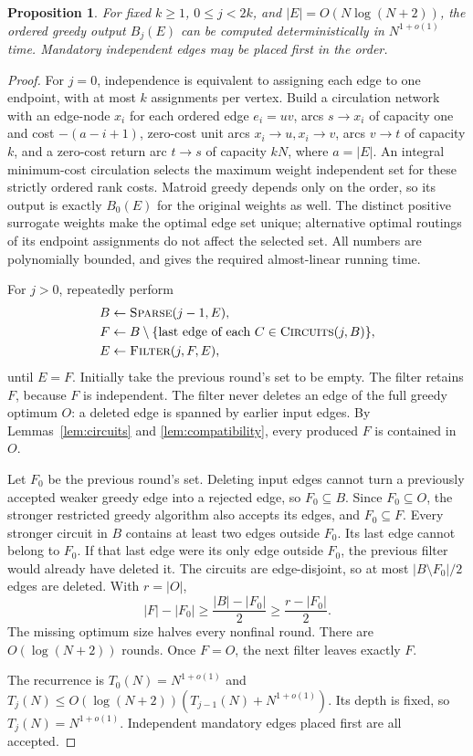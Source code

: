 \documentclass[11pt,a4paper]{article}
\newtheorem{proposition}[theorem]{Proposition}
\theoremstyle{definition}
\theoremstyle{remark}
\newcommand{\Bj}[2]{B_{#1}(#2)}
\newcommand{\Sparse}{\textsc{Sparse}}
\newcommand{\Filter}{\textsc{Filter}}
\newcommand{\Circuits}{\textsc{Circuits}}
\begin{document}
\begin{proposition}\label{prop:sparse}
For fixed $k\geq1$, $0\leq j<2k$, and $|E|=O(N\log(N+2))$, the ordered greedy
output $\Bj jE$ can be computed deterministically in
$N^{1+o(1)}$ time. Mandatory independent edges may be placed
first in the order.
\end{proposition}
\begin{proof}
For $j=0$, independence is equivalent to assigning each edge
to one endpoint, with at most $k$ assignments per vertex.
Build a circulation network with an edge-node $x_i$ for
each ordered edge $e_i=uv$, arcs $s\to x_i$ of capacity one
and cost $-(a-i+1)$, zero-cost unit arcs $x_i\to u,x_i\to v$,
arcs $v\to t$ of capacity $k$, and a zero-cost return arc
$t\to s$ of capacity $kN$, where $a=|E|$.
An integral minimum-cost circulation selects the maximum
weight independent set for these strictly ordered rank costs.
Matroid greedy depends only on the order, so its output is
exactly $\Bj0E$ for the original weights as well.
The distinct positive surrogate weights make the optimal edge
set unique; alternative optimal routings of its endpoint
assignments do not affect the selected set.
All numbers are polynomially bounded, and \cite{mcf} gives
the required almost-linear running time.

For $j>0$, repeatedly perform
\[
 \begin{aligned}
 B&\gets\Sparse(j-1,E),\\
 F&\gets B\setminus
 \{\text{last edge of each }C\in\Circuits(j,B)\},\\
 E&\gets\Filter(j,F,E),
 \end{aligned}
\]
until $E=F$. Initially take the previous round's set to be empty.
The filter retains $F$, because $F$ is independent.
The filter never deletes an edge of the full greedy optimum
$O$: a deleted edge is spanned by earlier input edges.
By Lemmas~\ref{lem:circuits} and \ref{lem:compatibility},
every produced $F$ is contained in $O$.

Let $F_0$ be the previous round's set. Deleting input edges
cannot turn a previously accepted weaker greedy edge into
a rejected edge, so $F_0\subseteq B$. Since $F_0\subseteq O$,
the stronger restricted greedy algorithm also accepts its
edges, and $F_0\subseteq F$.
Every stronger circuit in $B$ contains at least two edges
outside $F_0$. Its last edge cannot belong to $F_0$.
If that last edge were its only edge outside $F_0$, the
previous filter would already have deleted it.
The circuits are edge-disjoint, so at most
$|B\setminus F_0|/2$ edges are deleted. With $r=|O|$,
\[
 |F|-|F_0|\geq
 \frac{|B|-|F_0|}{2}\geq\frac{r-|F_0|}{2}.
\]
The missing optimum size halves every nonfinal round.
There are $O(\log(N+2))$ rounds. Once $F=O$, the next
filter leaves exactly $F$.

The recurrence is
$T_0(N)=N^{1+o(1)}$ and
$T_j(N)\leq O(\log(N+2))(T_{j-1}(N)+N^{1+o(1)})$.
Its depth is fixed, so $T_j(N)=N^{1+o(1)}$.
Independent mandatory edges placed first are all accepted.
\end{proof}
\end{document}
